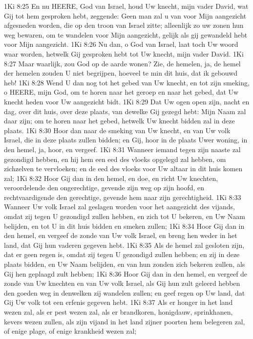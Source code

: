 1Ki 8:25  En nu HEERE, God van Israel, houd Uw knecht, mijn vader David, wat Gij tot hem gesproken hebt, zeggende: Geen man zal u van voor Mijn aangezicht afgesneden worden, die op den troon van Israel zitte; alleenlijk zo uw zonen hun weg bewaren, om te wandelen voor Mijn aangezicht, gelijk als gij gewandeld hebt voor Mijn aangezicht.
1Ki 8:26  Nu dan, o God van Israel, laat toch Uw woord waar worden, hetwelk Gij gesproken hebt tot Uw knecht, mijn vader David.
1Ki 8:27  Maar waarlijk, zou God op de aarde wonen? Zie, de hemelen, ja, de hemel der hemelen zouden U niet begrijpen, hoeveel te min dit huis, dat ik gebouwd heb!
1Ki 8:28  Wend U dan nog tot het gebed van Uw knecht, en tot zijn smeking, o HEERE, mijn God, om te horen naar het geroep en naar het gebed, dat Uw knecht heden voor Uw aangezicht bidt.
1Ki 8:29  Dat Uw ogen open zijn, nacht en dag, over dit huis, over deze plaats, van dewelke Gij gezegd hebt: Mijn Naam zal daar zijn; om te horen naar het gebed, hetwelk Uw knecht bidden zal in deze plaats.
1Ki 8:30  Hoor dan naar de smeking van Uw knecht, en van Uw volk Israel, die in deze plaats zullen bidden; en Gij, hoor in de plaats Uwer woning, in den hemel, ja, hoor, en vergeef.
1Ki 8:31  Wanneer iemand tegen zijn naaste zal gezondigd hebben, en hij hem een eed des vloeks opgelegd zal hebben, om zichzelven te vervloeken; en de eed des vloeks voor Uw altaar in dit huis komen zal;
1Ki 8:32  Hoor Gij dan in den hemel, en doe, en richt Uw knechten, veroordelende den ongerechtige, gevende zijn weg op zijn hoofd, en rechtvaardigende den gerechtige, gevende hem naar zijn gerechtigheid.
1Ki 8:33  Wanneer Uw volk Israel zal geslagen worden voor het aangezicht des vijands, omdat zij tegen U gezondigd zullen hebben, en zich tot U bekeren, en Uw Naam belijden, en tot U in dit huis bidden en smeken zullen;
1Ki 8:34  Hoor Gij dan in den hemel, en vergeef de zonde van Uw volk Israel, en breng hen weder in het land, dat Gij hun vaderen gegeven hebt.
1Ki 8:35  Als de hemel zal gesloten zijn, dat er geen regen is, omdat zij tegen U gezondigd zullen hebben; en zij in deze plaats bidden, en Uw Naam belijden, en van hun zonden zich bekeren zullen, als Gij hen geplaagd zult hebben;
1Ki 8:36  Hoor Gij dan in den hemel, en vergeef de zonde van Uw knechten en van Uw volk Israel, als Gij hun zult geleerd hebben den goeden weg in denwelken zij wandelen zullen; en geef regen op Uw land, dat Gij Uw volk tot een erfenis gegeven hebt.
1Ki 8:37  Als er honger in het land wezen zal, als er pest wezen zal, als er brandkoren, honigdauw, sprinkhanen, kevers wezen zullen, als zijn vijand in het land zijner poorten hem belegeren zal, of enige plage, of enige krankheid wezen zal;
